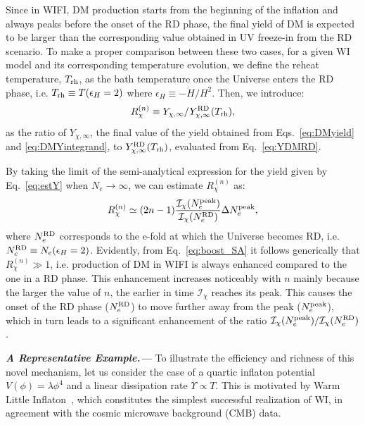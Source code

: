 \documentclass[notitlepage,nofootinbib,preprintnumbers,aps,superscriptaddress,twocolumn]{revtex4-1}
\begin{document}
Since in WIFI, DM production starts from the beginning of the inflation and always peaks before the onset of the RD phase, the final yield of DM is expected to be larger than the corresponding value obtained in UV freeze-in from the RD scenario. 
To make a proper comparison between these two cases, for a given WI model and its corresponding temperature evolution, we define the reheat temperature, $T_{\rm rh}$, as the bath temperature once the Universe enters the RD phase, i.e. $T_{\rm{rh}}\equiv T(\epsilon_H=2)$ where $\epsilon_H\equiv-\Dot{H}/H^2$. Then, we introduce:
\begin{equation}
    R^{(n)}_{\chi}\equiv Y_{\chi,\infty}/Y^{\rm{RD}}_{\chi,\infty}(T_{\rm{rh}}),\label{eq:enhancement_ratio}
\end{equation}
as the ratio of $Y_{\chi,\infty}$, the final value of the yield obtained from Eqs.~\eqref{eq:DMyield} and \eqref{eq:DMYintegrand}, to $Y_{\chi,\infty}^{\rm{RD}}(T_{\rm{rh}})$, evaluated from Eq.~\eqref{eq:YDMRD}.

By taking the limit of the semi-analytical expression for the yield given by Eq.~\eqref{eq:estY} when $N_e\rightarrow\infty$, we can estimate $R^{(n)}_{\chi}$ as:
\begin{eqnarray}
    R_\chi^{(n)}\simeq (2n-1) \frac{\mathcal{I}_\chi (N_e^{\rm{peak}})}{\mathcal{I}_\chi (N_e^{\rm{RD}})}\Delta N_e^{\rm{peak}}, \label{eq:boost_SA}
\end{eqnarray}
where $N_e^{\rm{RD}}$ corresponds to the e-fold at which the Universe becomes RD, i.e. $N_e^{\rm{RD}}\equiv N_e(\epsilon_H=2)$.
Evidently, from Eq.~\eqref{eq:boost_SA} it follows generically that $R_\chi^{(n)}\gg 1$, i.e. production of DM in WIFI is always enhanced compared to the one in a RD phase. This enhancement increases noticeably with $n$ mainly because the larger the value of $n$, the earlier in time $\mathcal{I}_\chi$ reaches its peak. This causes the onset of the RD phase ($N_e^{\rm{RD}}$) to move further away from the peak ($N_e^{\rm{peak}}$), which in turn leads to a significant enhancement of the ratio $\mathcal{I}_\chi (N_e^{\rm{peak}})/\mathcal{I}_\chi (N_e^{\rm{RD}})$.

 \textbf{{\textit{A Representative Example.---}}} To illustrate the efficiency and richness of this novel mechanism, let us consider the case of a quartic inflaton potential $V(\phi)=\lambda \phi^4$ and a linear dissipation rate $\Upsilon\propto T$. This is motivated by 
 Warm Little Inflaton~\cite{Bastero-Gil:2016qru, Bastero-Gil:2019gao}, which constitutes the simplest successful realization of WI, in agreement with the cosmic microwave background (CMB) data.
\end{document}
